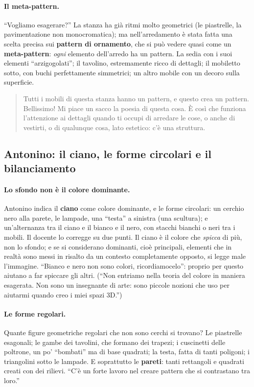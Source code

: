 \paragraph{Il meta-pattern.} ``Vogliamo esagerare?'' La stanza ha già ritmi molto
geometrici (le piastrelle, la pavimentazione non monocromatica); ma nell'arredamento è
stata fatta una scelta precisa sui \textbf{pattern di ornamento}, che si può vedere quasi
come un \textbf{meta-pattern}: \emph{ogni} elemento dell'arredo ha un pattern. La sedia
con i suoi elementi ``arzigogolati''; il tavolino, estremamente ricco di dettagli; il
mobiletto sotto, con buchi perfettamente simmetrici; un altro mobile con un decoro sulla
superficie.
\begin{quote}
Tutti i mobili di questa stanza hanno un pattern, e questo crea un pattern. Bellissimo!
Mi piace un sacco la poesia di questa cosa. È così che funziona l'attenzione ai dettagli
quando ti occupi di arredare le cose, o anche di vestirti, o di qualunque cosa, lato
estetico: c'è una struttura.
\end{quote}

\subsection{Antonino: il ciano, le forme circolari e il bilanciamento}

\paragraph{Lo sfondo non è il colore dominante.} Antonino indica il \textbf{ciano} come
colore dominante, e le forme circolari: un cerchio nero alla parete, le lampade, una
``testa'' a sinistra (una scultura); e un'alternanza tra il ciano e il bianco e il nero,
con stacchi bianchi o neri tra i mobili. Il docente lo corregge su due punti. Il ciano è
il colore che \emph{spicca} di più, non lo sfondo; e se si considerano dominanti, cioè
principali, elementi che in realtà sono messi in risalto da un contesto completamente
opposto, si legge male l'immagine. ``Bianco e nero non sono colori, ricordiamocelo'':
proprio per questo aiutano a far spiccare gli altri. (``Non entriamo nella teoria del
colore in maniera esagerata. Non sono un insegnante di arte: sono piccole nozioni che
uso per aiutarmi quando creo i miei spazi 3D.'')

\paragraph{Le forme regolari.} Quante figure geometriche regolari che non sono cerchi si
trovano? Le piastrelle esagonali; le gambe dei tavolini, che formano dei trapezi; i
cuscinetti delle poltrone, un po' ``bombati'' ma di base quadrati; la testa, fatta di
tanti poligoni; i triangolini sotto le lampade. E soprattutto le \textbf{pareti}: tanti
rettangoli e quadrati creati con dei rilievi. ``C'è un forte lavoro nel creare pattern
che si contrastano tra loro.''

